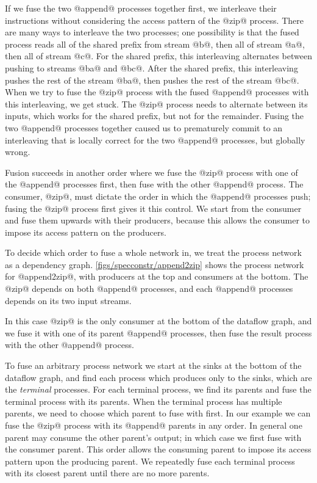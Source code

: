 If we fuse the two @append@ processes together first, we interleave their instructions without considering the access pattern of the @zip@ process.
There are many ways to interleave the two processes; one possibility is that the fused process reads all of the shared prefix from stream @b@, then all of stream @a@, then all of stream @c@.
For the shared prefix, this interleaving alternates between pushing to streams @ba@ and @bc@.
After the shared prefix, this interleaving pushes the rest of the stream @ba@, then pushes the rest of the stream @bc@.
When we try to fuse the @zip@ process with the fused @append@ processes with this interleaving, we get stuck.
The @zip@ process needs to alternate between its inputs, which works for the shared prefix, but not for the remainder.
Fusing the two @append@ processes together caused us to prematurely commit to an interleaving that is locally correct for the two @append@ processes, but globally wrong.

Fusion succeeds in another order where we fuse the @zip@ process with one of the @append@ processes first, then fuse with the other @append@ process.
The consumer, @zip@, must dictate the order in which the @append@ processes push; fusing the @zip@ process first gives it this control.
We start from the consumer and fuse them upwards with their producers, because this allows the consumer to impose its access pattern on the producers.



To decide which order to fuse a whole network in, we treat the process network as a dependency graph.
\autoref{figs/specconstr/append2zip} shows the process network for @append2zip@, with producers at the top and consumers at the bottom.
The @zip@ depends on both @append@ processes, and each @append@ processes depends on its two input streams.

In this case @zip@ is the only consumer at the bottom of the dataflow graph, and we fuse it with one of its parent @append@ processes, then fuse the result process with the other @append@ process.

To fuse an arbitrary process network we start at the sinks at the bottom of the dataflow graph, and find each process which produces only to the sinks, which are the \emph{terminal} processes.
For each terminal process, we find its parents and fuse the terminal process with its parents.
When the terminal process has multiple parents, we need to choose which parent to fuse with first.
In our example we can fuse the @zip@ process with its @append@ parents in any order.
In general one parent may consume the other parent's output; in which case we first fuse with the consumer parent.
This order allows the consuming parent to impose its access pattern upon the producing parent.
We repeatedly fuse each terminal process with its closest parent until there are no more parents.


